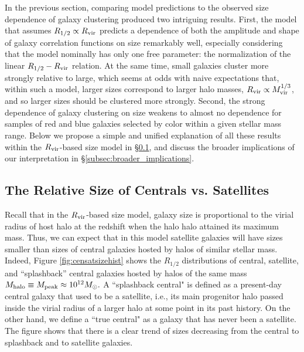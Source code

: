 \documentclass[usenatbib,usegraphicx,letterpaper]{mn2e}
\newcommand{\rhalf}{R_{1/2}}
\newcommand{\mvir}{M_{\rm vir}}
\newcommand{\mpeak}{M_{\rm peak}}
\newcommand{\mhalo}{M_{\rm halo}}
\newcommand{\rvir}{R_{\rm vir}}
\newcommand{\msun}{M_\odot}
\begin{document}
In the previous section, comparing model predictions to the observed size dependence of galaxy clustering produced two intriguing results. First, the model that assumes $\rhalf\propto\rvir$ predicts a dependence of both the amplitude and shape of  galaxy correlation functions on size remarkably well, especially considering that the model nominally has only one free parameter: the normalization of the linear $\rhalf-\rvir$ relation. At the same time, small galaxies cluster more strongly relative to large, which seems at odds with naive expectations that, within such a model, larger sizes correspond to larger halo masses, $\rvir\propto\mvir^{1/3}$, and so larger sizes should be clustered more strongly. Second, the strong dependence of galaxy clustering on size weakens to almost no dependence for samples of red and blue galaxies selected by color within a given stellar mass range. 
Below we propose a simple and unified explanation of all these results within the $\rvir$-based size model in \S\ref{subsec:censat_sizes}, and discuss the broader implications of our interpretation in \S\ref{subsec:broader_implications}.

\subsection{The Relative Size of Centrals vs. Satellites}
\label{subsec:censat_sizes}

Recall that in the $\rvir$-based size model, galaxy size is proportional to the virial radius of host halo at the redshift  when the halo halo attained its maximum mass. Thus, we can expect that in this model satellite galaxies will have sizes smaller than sizes of central galaxies hosted by halos of similar stellar mass.  Indeed, Figure \ref{fig:censatsizehist} shows the $\rhalf$ distributions of central, satellite, and ``splashback'' central galaxies hosted by halos of the same mass $\mhalo\equiv\mpeak\approx10^{12}\msun.$ A ``splashback central"  is defined as a present-day central galaxy that used to be a satellite, i.e., its main progenitor halo passed inside the virial radius of a larger halo at some point in its past history. On the other hand, we define a ``true central" as a galaxy that has never been a satellite. The figure shows that there is a clear trend of sizes decreasing from the central to splashback and to satellite galaxies. 
\end{document}
